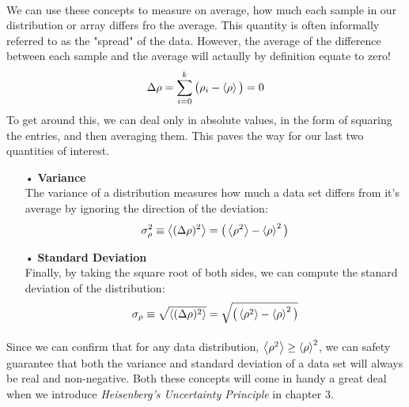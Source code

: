 \documentclass[12pt,letterpaper]{book}
\begin{document}
\paragraph*{}We can use these concepts to measure on average, how much each sample in our distribution or array differs fro the average. This quantity is often informally referred to as the "spread" of the data. However, the average of the difference between each sample and the average will actaully by definition equate to zero!
\begin{equation}
\label{spread}
\Delta \rho = \sum_{i=0}^{k} \big( \rho_i - \expval{\rho} \big) = 0
\end{equation}
To get around this, we can deal only in absolute values, in the form of squaring the entries, and then averaging them. This paves the way for our last two quantities of interest.

\begin{enumerate}

\item[•]\textbf{Variance}\\
The variance of a distribution measures how much a data set differs from it's average by ignoring the direction of the deviation:
\begin{equation}
\label{variance}
\sigma_{\rho}^2 \equiv \expval{(\Delta \rho)^2} = \big( \expval{\rho^2} - \expval{\rho}^2 \big)
\end{equation}

\item[•]\textbf{Standard Deviation}\\
Finally, by taking the square root of both sides, we can compute the stanard deviation of the distribution:
\begin{equation}
\label{std dev}
\sigma_{\rho} \equiv \sqrt{\expval{(\Delta \rho)^2}} = \sqrt{\big( \expval{\rho^2} - \expval{\rho}^2 \big)}
\end{equation}
\end{enumerate}
\paragraph*{}Since we can confirm that for any data distribution, $\expval{\rho^2} \geq \expval{\rho}^2$, we can safety guarantee that both the variance and standard deviation of a data set will always be real and non-negative. Both these concepts will come in handy a great deal when we introduce \textit{Heisenberg's Uncertainty Principle} in chapter 3.

\end{document}

